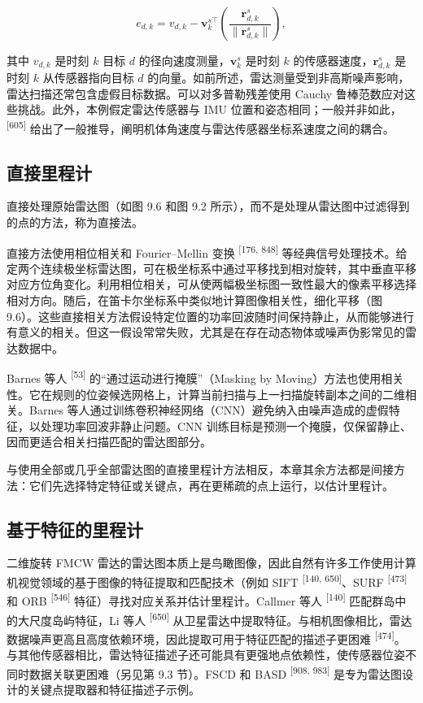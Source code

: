 \begin{equation}
e _ {d,k} = v _ {d,k} - \boldsymbol {v} _ {k}^{s\top} \left(\frac {\boldsymbol {r}_{d,k}^{s}}{\|\boldsymbol {r}_{d,k}^{s}\|}\right),\tag{9.14}
\end{equation}

其中 $v_{d,k}$ 是时刻 $k$ 目标 $d$ 的径向速度测量，$\boldsymbol {v}_{k}^{s}$ 是时刻 $k$ 的传感器速度，$\boldsymbol {r}_{d,k}^{s}$ 是时刻 $k$ 从传感器指向目标 $d$ 的向量。如前所述，雷达测量受到非高斯噪声影响，雷达扫描还常包含虚假目标数据。可以对多普勒残差使用 Cauchy 鲁棒范数应对这些挑战。此外，本例假定雷达传感器与 IMU 位置和姿态相同；一般并非如此，\textsuperscript{[605]} 给出了一般推导，阐明机体角速度与雷达传感器坐标系速度之间的耦合。

\subsection{直接里程计}

直接处理原始雷达图（如图 9.6 和图 9.2 所示），而不是处理从雷达图中过滤得到的点的方法，称为直接法。

直接方法使用相位相关和 Fourier--Mellin 变换 \textsuperscript{[176, 848]} 等经典信号处理技术。给定两个连续极坐标雷达图，可在极坐标系中通过平移找到相对旋转，其中垂直平移对应方位角变化。利用相位相关，可从使两幅极坐标图一致性最大的像素平移选择相对方向。随后，在笛卡尔坐标系中类似地计算图像相关性，细化平移（图 9.6）。这些直接相关方法假设特定位置的功率回波随时间保持静止，从而能够进行有意义的相关。但这一假设常常失败，尤其是在存在动态物体或噪声伪影常见的雷达数据中。

Barnes 等人 \textsuperscript{[53]} 的“通过运动进行掩膜”（Masking by Moving）方法也使用相关性。它在规则的位姿候选网格上，计算当前扫描与上一扫描旋转副本之间的二维相关。Barnes 等人通过训练卷积神经网络（CNN）避免纳入由噪声造成的虚假特征，以处理功率回波非静止问题。CNN 训练目标是预测一个掩膜，仅保留静止、因而更适合相关扫描匹配的雷达图部分。

与使用全部或几乎全部雷达图的直接里程计方法相反，本章其余方法都是间接方法：它们先选择特定特征或关键点，再在更稀疏的点上运行，以估计里程计。

\subsection{基于特征的里程计}

二维旋转 FMCW 雷达的雷达图本质上是鸟瞰图像，因此自然有许多工作使用计算机视觉领域的基于图像的特征提取和匹配技术（例如 SIFT \textsuperscript{[140, 650]}、SURF \textsuperscript{[473]} 和 ORB \textsuperscript{[546]} 特征）寻找对应关系并估计里程计。Callmer 等人 \textsuperscript{[140]} 匹配群岛中的大尺度岛屿特征，Li 等人 \textsuperscript{[650]} 从卫星雷达中提取特征。与相机图像相比，雷达数据噪声更高且高度依赖环境，因此提取可用于特征匹配的描述子更困难 \textsuperscript{[474]}。与其他传感器相比，雷达特征描述子还可能具有更强地点依赖性，使传感器位姿不同时数据关联更困难（另见第 9.3 节）。FSCD 和 BASD \textsuperscript{[908, 983]} 是专为雷达图设计的关键点提取器和特征描述子示例。

